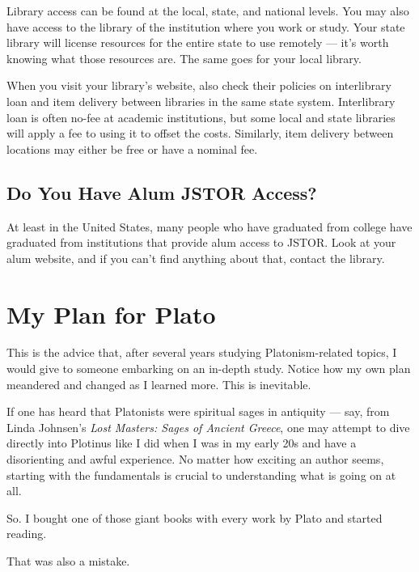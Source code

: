 \documentclass[
]{book}
\begin{document}
Library access can be found at the local, state, and national levels. You may also have access to the library of the institution where you work or study. Your state library will license resources for the entire state to use remotely --- it's worth knowing what those resources are. The same goes for your local library.

When you visit your library's website, also check their policies on interlibrary loan and item delivery between libraries in the same state system. Interlibrary loan is often no-fee at academic institutions, but some local and state libraries will apply a fee to using it to offset the costs. Similarly, item delivery between locations may either be free or have a nominal fee.

\hypertarget{do-you-have-alum-jstor-access}{%
\subsection{Do You Have Alum JSTOR Access?}\label{do-you-have-alum-jstor-access}}

At least in the United States, many people who have graduated from college have graduated from institutions that provide alum access to JSTOR. Look at your alum website, and if you can't find anything about that, contact the library.

\hypertarget{my-plan-for-plato}{%
\section{My Plan for Plato}\label{my-plan-for-plato}}

This is the advice that, after several years studying Platonism-related topics, I would give to someone embarking on an in-depth study. Notice how my own plan meandered and changed as I learned more. This is inevitable.

If one has heard that Platonists were spiritual sages in antiquity --- say, from Linda Johnsen's \emph{Lost Masters: Sages of Ancient Greece}, one may attempt to dive directly into Plotinus like I did when I was in my early 20s and have a disorienting and awful experience. No matter how exciting an author seems, starting with the fundamentals is crucial to understanding what is going on at all.

So. I bought one of those giant books with every work by Plato and started reading.

That was also a mistake.
\end{document}
